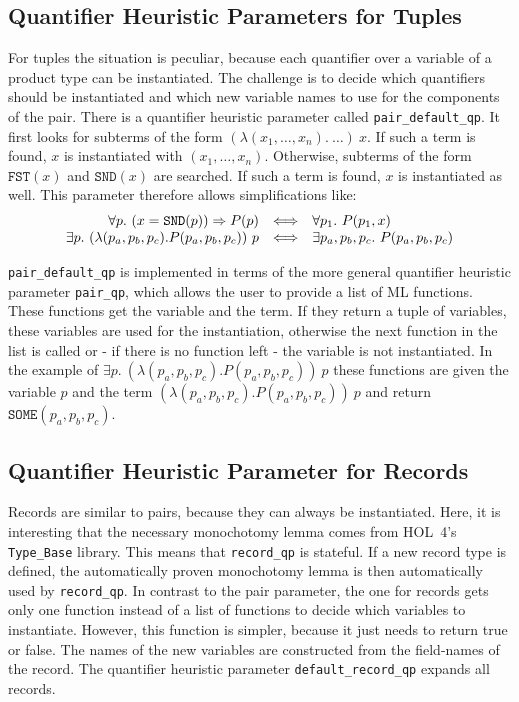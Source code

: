 \documentclass[a4paper,12pt,DIV=12,oneside]{scrbook}
\theoremstyle{definition}
\theoremstyle{remark}
\begin{document}
\subsection{Quantifier Heuristic Parameters for Tuples}

For tuples the situation is peculiar, because each quantifier over a variable of a product type
can be instantiated. The challenge is to decide which quantifiers should be instantiated and
which new variable names to use for the components of the pair.
There is a quantifier heuristic parameter called \texttt{pair\_default\_qp}. It first looks for
subterms of the form $(\lambda (x_1, \ldots, x_n).\ \ldots)\ x$. If such a term is found, $x$ is instantiated with
$(x_1, \ldots, x_n)$. Otherwise, subterms of the form $\texttt{FST}(x)$ and $\texttt{SND}(x)$ are searched. If such a term
is found, $x$ is instantiated as well. This parameter therefore allows simplifications like:
%
\[\begin{array}{r@{\quad \Longleftrightarrow \quad}l}
\forall p.\ (x = \texttt{SND}(p)) \Rightarrow P(p)& \forall p_1.\ P(p_1, x) \\
\exists p.\ (\lambda (p_a, p_b, p_c). P(p_a, p_b, p_c))\ p & \exists p_a, p_b, p_c.\ P(p_a, p_b, p_c)
\end{array}\]

\texttt{pair\_default\_qp} is implemented in terms of the more general
quantifier heuristic parameter \texttt{pair\_qp}, which allows the
user to provide a list of ML functions. These functions get the
variable and the term. If they return a tuple of variables, these
variables are used for the instantiation, otherwise the next function
in the list is called or - if there is no function left - the variable
is not instantiated. In the example of $\exists p.\ (\lambda (p_a,
p_b, p_c). P(p_a, p_b, p_c))\ p$ these functions are given the
variable $p$ and the term $(\lambda (p_a, p_b, p_c). P(p_a, p_b,
p_c))\ p$ and return $\texttt{SOME} (p_a, p_b, p_c)$.

\subsection{Quantifier Heuristic Parameter for Records}

Records are similar to pairs, because they can always be instantiated. Here, it is interesting that the necessary
monochotomy lemma comes from HOL~4's \texttt{Type\_Base} library. This means that \texttt{record\_qp} is stateful.
If a new record type is defined, the automatically proven monochotomy lemma is then automatically used
by \texttt{record\_qp}. In contrast to the pair parameter, the one for records gets only one function instead of a
list of functions to decide which variables to instantiate. However, this function is simpler, because it just needs
to return true or false. The names of the new variables are constructed from the field-names of the record.
The quantifier heuristic parameter \texttt{default\_record\_qp} expands all records.
\end{document}
